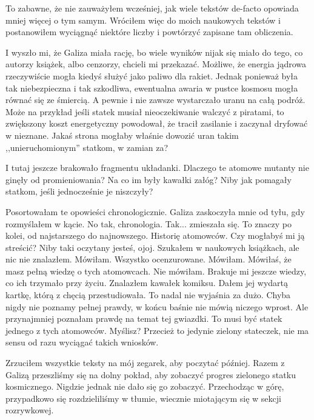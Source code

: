 To zabawne, że nie zauważyłem wcześniej, jak wiele tekstów de-facto opowiada mniej więcej o tym samym. 
Wróciłem więc do moich naukowych tekstów i postanowiłem wyciągnąć niektóre liczby i powtórzyć zapisane tam obliczenia.

I wyszło mi, że Galiza miała rację, bo wiele wyników nijak się miało do tego, co autorzy książek, albo cenzorzy, chcieli mi przekazać.
Możliwe, że energia jądrowa rzeczywiście mogła kiedyś służyć jako paliwo dla rakiet. Jednak ponieważ była tak niebezpieczna i tak szkodliwa, ewentualna awaria w pustce kosmosu mogła równać się ze śmiercią. 
A pewnie i nie zawsze wystarczało uranu na całą podróż. Może na przykład jeśli statek musiał nieoczekiwanie walczyć z piratami, to zwiększony koszt energetyczny powodował, że tracił zasilanie i zaczynał dryfować w nieznane. Jakaś strona mogłaby właśnie dowozić uran takim ,,unieruchomionym'' statkom, w zamian za?

I tutaj jeszcze brakowało fragmentu układanki. Dlaczego te atomowe mutanty nie ginęły od promieniowania? Na co im były kawałki załóg?
Niby jak pomagały statkom, jeśli jednocześnie je niszczyły?

\begin{dialogue}
	\ds{} Posortowałam te opowieści chronologicznie. \dm{} Galiza zaskoczyła mnie od tyłu, gdy rozmyślałem w kącie.
	\ds{} No tak, chronologia. 
	\ds{} Tak... \dm{} zmieszała się. \dm{} To znaczy po kolei, od najstarszego do najnowszego. Historię atomowców.
	\ds{} Czy mogłabyś mi ją streścić?
	\ds{} Niby taki oczytany jesteś, ojoj.
	\ds{} Szukałem w naukowych książkach, ale nic nie znalazłem.
	\ds{} Mówiłam.
	\ds{} Wszystko ocenzurowane.
	\ds{} Mówiłam.
	\ds{} Mówiłaś, że masz pełną wiedzę o tych atomowcach.
	\ds{} Nie mówiłam. Brakuje mi jeszcze wiedzy, co ich trzymało przy życiu.
	\ds{} Znalazłem kawałek komiksu. \dm{} Dałem jej wydartą kartkę, którą z chęcią przestudiowała.
	\ds{} To nadal nie wyjaśnia za dużo.
	\ds{} Chyba nigdy nie poznamy pełnej prawdy, w końcu baśnie nie mówią niczego wprost.
	\ds{} Ale przynajmniej poznałam prawdę na temat tej gwiazdki. To musi być statek jednego z tych atomowców.
	\ds{} Myślisz? Przecież to jedynie zielony stateczek, nie ma sensu od razu wyciągać takich wniosków.
\end{dialogue}

Zrzuciłem wszystkie teksty na mój zegarek, aby poczytać później.
Razem z Galizą przeszliśmy się na dolny pokład, aby zobaczyć progres zielonego statku kosmicznego.
Nigdzie jednak nie dało się go zobaczyć.
Przechodząc w górę, przypadkowo się rozdzieliliśmy w tłumie, wiecznie miotającym się w sekcji rozrywkowej.

